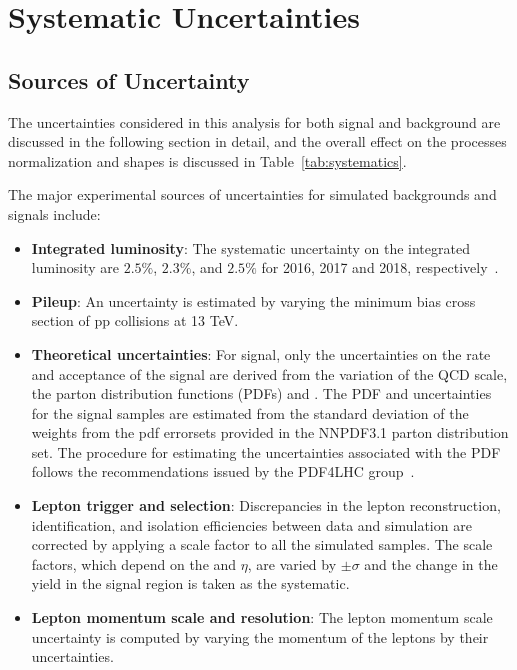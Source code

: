 \chapter{Systematic Uncertainties}
\label{ch:sys_unc}

\section{Sources of Uncertainty}

The uncertainties considered in this analysis for both signal and background are discussed in the following section in detail, 
and the overall effect on the processes normalization and shapes is discussed in Table~\ref{tab:systematics}.

The major experimental sources of uncertainties for simulated backgrounds and signals include:
\begin{itemize}

  \item {\bf Integrated luminosity}: The systematic uncertainty on the integrated luminosity are $2.5\%$, $2.3\%$, and $2.5\%$ for 2016, 2017 and 2018, respectively~\cite{CMS-PAS-LUM-17-001,CMS-PAS-LUM-17-004,CMS-PAS-LUM-18-002}.

  \item {\bf Pileup}: An uncertainty is estimated by varying the minimum bias cross section of pp collisions at 13 TeV.

  \item {\bf Theoretical uncertainties}: For signal, only the uncertainties on the rate and acceptance of the signal are derived from the variation of the QCD scale, the parton distribution functions (PDFs) and \alpS.
  The PDF and \alpS uncertainties for the \MADGRAPH signal samples are estimated from the standard deviation of the weights from the pdf errorsets provided in the NNPDF3.1 parton distribution set.
  The procedure for estimating the uncertainties associated with the PDF follows the recommendations issued by the PDF4LHC group~\cite{PDF4LHC}.

  \item {\bf Lepton trigger and selection}: Discrepancies in the lepton reconstruction, identification, and isolation efficiencies between data and simulation are corrected by applying a scale factor to all the simulated samples.
The scale factors, which depend on the \pt and $\eta$, are varied by $\pm \sigma$ and the change in the yield in the signal region is taken as the systematic. 

  \item {\bf Lepton momentum scale and resolution}: The lepton momentum scale uncertainty is computed by varying the momentum of the leptons by their uncertainties.


\end{itemize}
